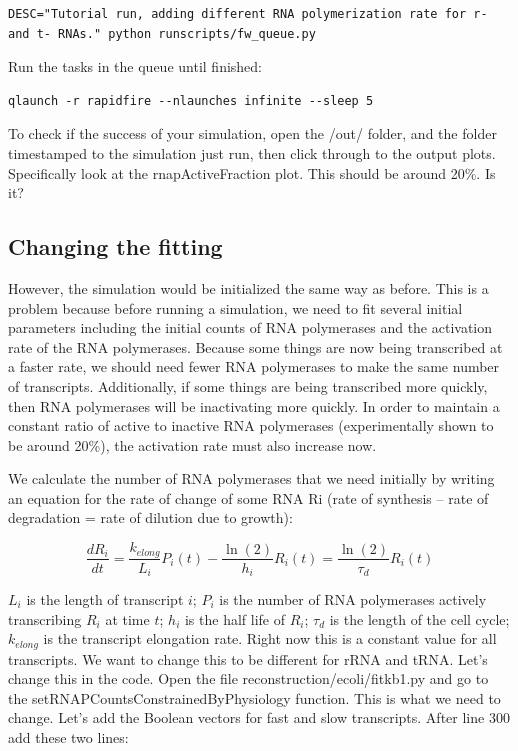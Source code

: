 \documentclass[12pt]{article}
\begin{document}
\lstset{language=bash}
\begin{lstlisting}
DESC="Tutorial run, adding different RNA polymerization rate for r- and t- RNAs." python runscripts/fw_queue.py
\end{lstlisting}

Run the tasks in the queue until finished:

\begin{lstlisting}
qlaunch -r rapidfire --nlaunches infinite --sleep 5
\end{lstlisting}

To check if the success of your simulation, open the /out/ folder, and the folder timestamped to the simulation just run, then click through to the output plots. Specifically look at the rnapActiveFraction plot. This should be around 20\%. Is it?

\subsection{Changing the fitting}

However, the simulation would be initialized the same way as before. This is a problem because before running a simulation, we need to fit several initial parameters including the initial counts of RNA polymerases and the activation rate of the RNA polymerases. Because some things are now being transcribed at a faster rate, we should need fewer RNA polymerases to make the same number of transcripts. Additionally, if some things are being transcribed more quickly, then RNA polymerases will be inactivating more quickly. In order to maintain a constant ratio of active to inactive RNA polymerases (experimentally shown to be around 20\%), the activation rate must also increase now. 

\par

We calculate the number of RNA polymerases that we need initially by writing an equation for the rate of change of some RNA Ri (rate of synthesis – rate of degradation = rate of dilution due to growth):

$$
\frac{d R_i}{dt} = \frac{k_{elong}}{L_i}P_i(t) - \frac{\ln(2)}{h_i}R_i(t) = \frac{\ln(2)}{\tau_d}R_i(t)
$$


$L_i$ is the length of transcript $i$; $P_i$ is the number of RNA polymerases actively transcribing $R_i$ at time $t$; $h_i$ is the half life of $R_i$; $\tau_d$ is the length of the cell cycle; $k_{elong}$ is the transcript elongation rate. Right now this is a constant value for all transcripts. We want to change this to be different for rRNA and tRNA. Let’s change this in the code. Open the file reconstruction/ecoli/fitkb1.py and go to the setRNAPCountsConstrainedByPhysiology function. This is what we need to change. Let’s add the Boolean vectors for fast and slow transcripts. After line 300 add these two lines:
\end{document}
